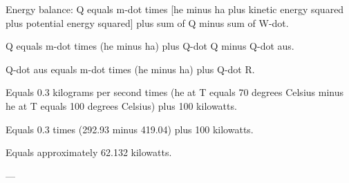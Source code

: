 Energy balance:  
Q equals m-dot times [he minus ha plus kinetic energy squared plus potential energy squared] plus sum of Q minus sum of W-dot.  

Q equals m-dot times (he minus ha) plus Q-dot Q minus Q-dot aus.  

Q-dot aus equals m-dot times (he minus ha) plus Q-dot R.  

Equals 0.3 kilograms per second times (he at T equals 70 degrees Celsius minus he at T equals 100 degrees Celsius) plus 100 kilowatts.  

Equals 0.3 times (292.93 minus 419.04) plus 100 kilowatts.  

Equals approximately 62.132 kilowatts.  

---
